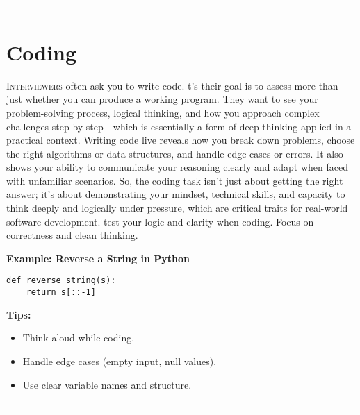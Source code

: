 \documentclass{book}
\begin{document}
---

\section{Coding}

\lettrine{I}{nterviewers} often ask you to write code. t’s their goal is to assess more than just whether you
can produce a working program. They want to see your problem-solving process, logical thinking,
and how you approach complex challenges step-by-step—which is essentially a form of deep thinking
applied in a practical context. Writing code live reveals how you break down problems, choose the right
algorithms or data structures, and handle edge cases or errors. It also shows your ability to communicate
your reasoning clearly and adapt when faced with unfamiliar scenarios. So, the coding task isn’t just
about getting the right answer; it’s about demonstrating your mindset, technical skills, and capacity to
think deeply and logically under pressure, which are critical traits for real-world software development. 
test your logic and clarity when coding. Focus on correctness and clean thinking.

\vspace{0.4cm}
\noindent\textbf{Example: Reverse a String in Python}
\begin{verbatim}
def reverse_string(s):
    return s[::-1]
\end{verbatim}

\vspace{0.4cm}
\noindent\textbf{Tips:}
\begin{itemize}
  \item Think aloud while coding.
  \item Handle edge cases (empty input, null values).
  \item Use clear variable names and structure.
\end{itemize}

---
\end{document}
